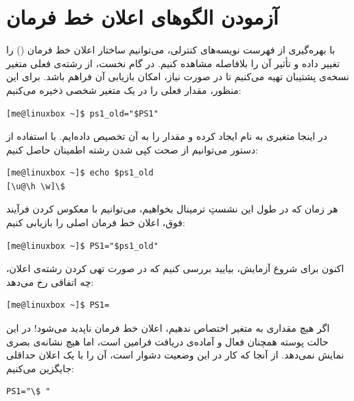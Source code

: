 \section{آزمودن الگوهای اعلان خط فرمان}

با بهره‌گیری از فهرست نویسه‌های کنترلی، می‌توانیم ساختار اعلان خط فرمان () را تغییر داده و تأثیر آن را بلافاصله مشاهده کنیم. در گام نخست، از رشته‌ی فعلی متغیر  نسخه‌ی پشتیبان تهیه می‌کنیم تا در صورت نیاز، امکان بازیابی آن فراهم باشد. برای این منظور، مقدار فعلی را در یک متغیر شخصی ذخیره می‌کنیم:

\begin{latin}
\begin{lstlisting}
[me@linuxbox ~]$ ps1_old="$PS1"
\end{lstlisting}
\end{latin}

در اینجا متغیری به نام  ایجاد کرده و مقدار  را به آن تخصیص داده‌ایم. با استفاده از دستور  می‌توانیم از صحت کپی شدن رشته اطمینان حاصل کنیم:

\begin{latin}
\begin{lstlisting}
[me@linuxbox ~]$ echo $ps1_old
[\u@\h \w]\$
\end{lstlisting}
\end{latin}

هر زمان که در طول این نشستِ ترمینال بخواهیم، می‌توانیم با معکوس کردن فرآیند فوق، اعلان خط فرمان اصلی را بازیابی کنیم:

\begin{latin}
\begin{lstlisting}
[me@linuxbox ~]$ PS1="$ps1_old"
\end{lstlisting}
\end{latin}

اکنون برای شروع آزمایش، بیایید بررسی کنیم که در صورت تهی کردن رشته‌ی اعلان، چه اتفاقی رخ می‌دهد:

\begin{latin}
\begin{lstlisting}
[me@linuxbox ~]$ PS1=
\end{lstlisting}
\end{latin}

اگر هیچ مقداری به متغیر  اختصاص ندهیم، اعلان خط فرمان ناپدید می‌شود! در این حالت پوسته همچنان فعال و آماده‌ی دریافت فرامین است، اما هیچ نشانه‌ی بصری نمایش نمی‌دهد. از آنجا که کار در این وضعیت دشوار است، آن را با یک اعلان حداقلی جایگزین می‌کنیم:

\begin{latin}
\begin{lstlisting}
PS1="\$ "
\end{lstlisting}
\end{latin}

